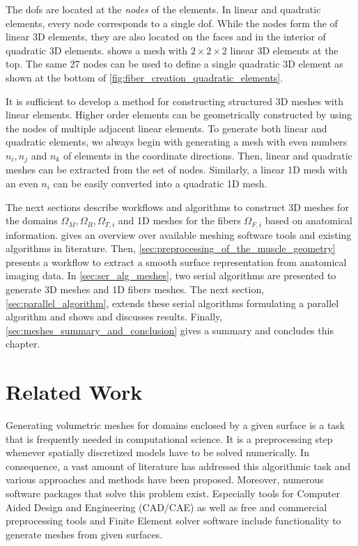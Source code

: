 The dofs are located at the \emph{nodes} of the elements. In linear and quadratic elements, every node corresponds to a single dof. While the nodes form the  of linear 3D elements, they are also located on the faces and in the interior of quadratic 3D elements.  shows a mesh with $2 \times 2 \times 2$ linear 3D elements at the top. The same 27 nodes can be used to define a single quadratic 3D element as shown at the bottom of \cref{fig:fiber_creation_quadratic_elements}. 

It is sufficient to develop a method for constructing structured 3D meshes with linear elements. 
Higher order elements can be geometrically constructed by using the nodes of multiple adjacent linear elements.
To generate both linear and quadratic elements, we always begin with generating a mesh with even numbers $n_i,n_j$ and $n_k$ of elements in the coordinate directions. Then, linear and quadratic meshes can be extracted from the set of nodes. Similarly, a linear 1D mesh with an even $n_i$ can be easily converted into a quadratic 1D mesh.

The next sections describe workflows and algorithms to construct 3D meshes for the domains $\Omega_M,\Omega_B,\Omega_{T,i}$ and 1D meshes for the fibers $\Omega_{F,i}$ based on anatomical information.  gives an overview over available meshing software tools and existing algorithms in literature. Then, \cref{sec:preprocessing_of_the_muscle_geometry} presents a workflow to extract a smooth surface representation from anatomical imaging data. In \cref{sec:ser_alg_meshes}, two serial algorithms are presented to generate 3D meshes and 1D fibers meshes. The next section, \cref{sec:parallel_algorithm}, extends these serial algorithms formulating a parallel algorithm and shows and discusses results. Finally, \cref{sec:meshes_summary_and_conclusion} gives a summary and concludes this chapter.

\section{Related Work}\label{sec:fiber_meshes_related_works}

Generating volumetric meshes for domains enclosed by a given surface is a task that is frequently needed in computational science. It is a preprocessing step whenever spatially discretized models have to be solved numerically. In consequence, a vast amount of literature has addressed this algorithmic task and various approaches and methods have been proposed. Moreover, numerous software packages that solve this problem exist. Especially tools for Computer Aided Design and Engineering (CAD/CAE) as well as free and commercial preprocessing tools and Finite Element solver software include functionality to generate meshes from given surfaces.


